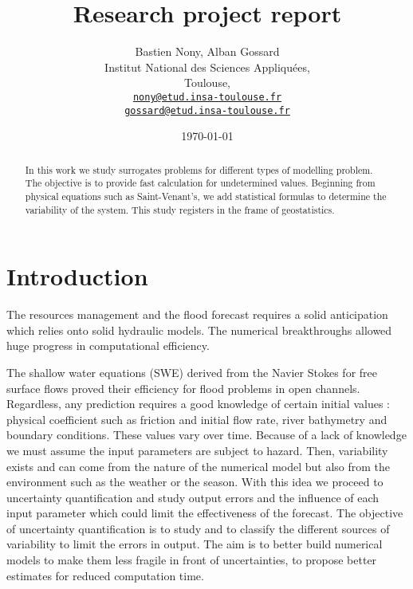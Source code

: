 \documentclass[hidelinks,12pt]{article}
\begin{document}
\title{Research project report}
\author{Bastien Nony, Alban Gossard\\
Institut National des Sciences Appliquées,\\
Toulouse,\\
\href{mailto:nony@etud.insa-toulouse.fr}{   \texttt{nony@etud.insa-toulouse.fr}}\\
\href{mailto:gossard@etud.insa-toulouse.fr}{   \texttt{gossard@etud.insa-toulouse.fr}}}
\date{\today}

\maketitle

\begin{abstract}
In this work we study surrogates problems for different types of modelling problem. The objective is to provide fast calculation for undetermined values. Beginning from physical equations such as Saint-Venant's, we add statistical formulas to determine the variability of the system. This study registers in the frame of geostatistics.
\end{abstract}

\newpage

\tableofcontents

\section{Introduction}

The resources management and the flood forecast requires a solid anticipation which relies onto solid hydraulic models. The numerical breakthroughs allowed huge progress in computational efficiency.

The shallow water equations (SWE) derived from the Navier Stokes for free surface flows proved their efficiency for flood problems in open channels. Regardless, any prediction requires a good knowledge of certain initial values : physical coefficient such as friction and initial flow rate, river bathymetry and boundary conditions. These values vary over time. Because of a lack of knowledge we must assume the input parameters are subject to hazard. Then, variability exists and can come from the nature of the numerical model but also from the environment such as the weather or the season. With this idea we proceed to uncertainty quantification and study output errors and the influence of each input parameter which could limit the effectiveness of the forecast. The objective of uncertainty quantification is to study and to classify the different sources of variability to limit the errors in output. The aim is to better build numerical models to make them less fragile in front of uncertainties, to propose better estimates for reduced computation time.
\end{document}
